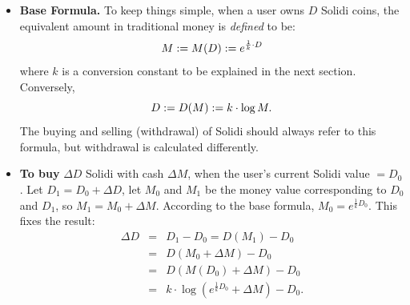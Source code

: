 \begin{itemize}
	\item \textbf{Base Formula.}  To keep things simple, when a user owns $D$ Solidi coins, the equivalent amount in traditional money is \textit{defined} to be:
		\begin{equation}
			\label{eqn:base-formula}
			M \mathrel{:}= M(D) \mathrel{:}= e^{\frac{1}{k} \cdot D}
		\end{equation}
	where $k$ is a conversion constant to be explained in the next section.  Conversely,
		\begin{equation}
			\label{eqn:base-formula-inverse}
			D \mathrel{:}= D(M) \mathrel{:}= k \cdot \log M .
		\end{equation}
	The buying and selling (withdrawal) of Solidi should always refer to this formula, but withdrawal is calculated differently.

	\item \textbf{To buy} $\Delta D$ Solidi with cash $\Delta M$, when the user's current Solidi value $= D_0$.  Let $D_1 = D_0 + \Delta D$, let $M_0$ and $M_1$ be the money value corresponding to $D_0$ and $D_1$, so $M_1 = M_0 + \Delta M$.  According to the base formula, $M_0 = e^{\frac{1}{k} D_0}$.  This fixes the result:
 		\begin{eqnarray}
			\Delta D &=& D_1 - D_0 = D(M_1) - D_0 \nonumber \\
			&=& D( M_0 + \Delta M) - D_0 \nonumber \\
			&=& D( M(D_0) + \Delta M) - D_0 \nonumber \\
			&=& k \cdot \log (e^{\frac{1}{k} D_0} + \Delta M) - D_0 .
		\end{eqnarray}


\end{itemize}

